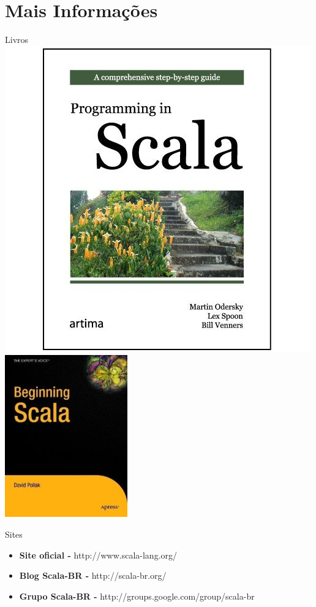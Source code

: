 \section{Mais Informações}

\begin{frame}{Livros}
	\includegraphics[scale=0.3]{conclusao/progInScala.jpg}
	\includegraphics[scale=0.4]{conclusao/beginning-scala.jpg}
\end{frame}

\begin{frame}{Sites}
	\begin{block}{ }
		\begin{itemize}
			\item \textbf{Site oficial -} http://www.scala-lang.org/
			\item \textbf{Blog Scala-BR -} http://scala-br.org/
			\item \textbf{Grupo Scala-BR -} http://groups.google.com/group/scala-br 
		\end{itemize}
	\end{block}
\end{frame}